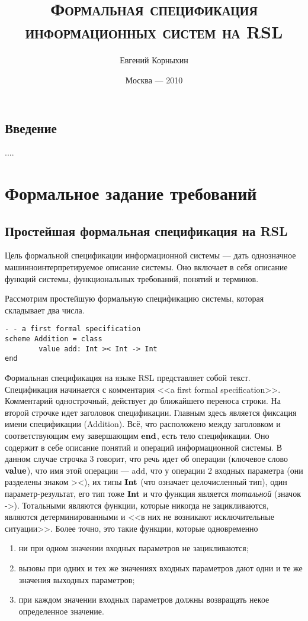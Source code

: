 \documentclass[14pt]{extreport}
\author{Евгений Корныхин}
\title{\huge{\textbf{\textsc{Формальная спецификация информационных систем на RSL}}}}
\date{Москва --- 2010}
\begin{document}
\maketitle

\tableofcontents

\pagebreak

\section*{Введение}
....

\chapter{Формальное задание требований}

\section{Простейшая формальная спецификация на RSL}

Цель формальной спецификации информационной системы --- дать однозначное машинноинтерпретируемое описание системы. Оно включает в себя описание функций системы, функциональных требований, понятий и терминов.

Рассмотрим простейшую формальную спецификацию системы, которая складывает два числа.

\begin{lstlisting}
- - a first formal specification
scheme Addition = class
        value add: Int >< Int -> Int
end
\end{lstlisting}

Формальная спецификация на языке RSL представляет собой текст. Спецификация начинается с комментария <<a first formal specification>>. Комментарий однострочный, действует до ближайшего переноса строки. На второй строчке идет заголовок спецификации. Главным здесь является фиксация имени спецификации (Addition). Всё, что расположено между заголовком и соответствующим ему завершающим $\textbf{end}$, есть тело спецификации. Оно содержит в себе описание понятий и операций информационной системы. В данном случае строчка 3 говорит, что речь идет об операции (ключевое слово $\textbf{value}$), что имя этой операции --- add, что у операции 2 входных параметра (они разделены знаком ><), их типы $\textbf{Int}$ (что означает целочисленный тип), один параметр-результат, его тип тоже $\textbf{Int}$ и что функция является \emph{тотальной} (значок ->). Тотальными являются функции, которые никогда не зацикливаются, являются детерминированными и <<в них не возникают исключительные ситуации>>. Более точно, это такие функции, которые одновременно
\begin{enumerate}
\item ни при одном значении входных параметров не зацикливаются;
\item вызовы при одних и тех же значениях входных параметров дают одни и те же значения выходных параметров;
\item при каждом значении входных параметров должны возвращать некое определенное значение.
\end{enumerate}
\end{document}
